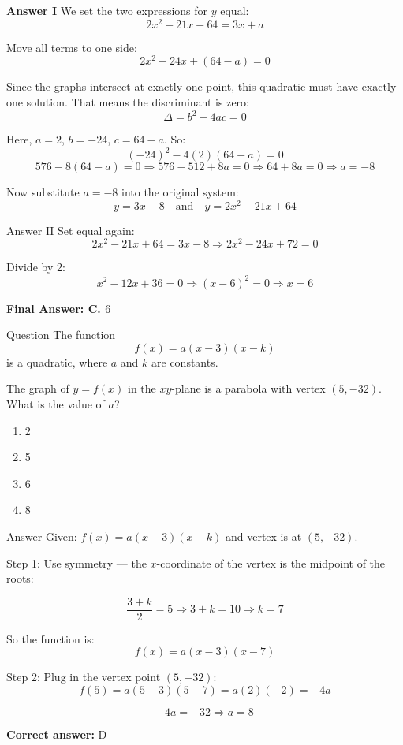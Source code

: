 \documentclass{beamer}
\begin{document}
\begin{frame}{\textbf{Answer I}}
\small
We set the two expressions for \(y\) equal:
\[
2x^2 - 21x + 64 = 3x + a
\]

Move all terms to one side:
\[
2x^2 - 24x + (64 - a) = 0
\]

Since the graphs intersect at exactly one point, this quadratic must have exactly one solution. That means the discriminant is zero:
\[
\Delta = b^2 - 4ac = 0
\]

Here, \(a = 2\), \(b = -24\), \(c = 64 - a\). So:
\[
(-24)^2 - 4(2)(64 - a) = 0
\]
\[
576 - 8(64 - a) = 0
\Rightarrow 576 - 512 + 8a = 0
\Rightarrow 64 + 8a = 0 \Rightarrow a = -8
\]

Now substitute \(a = -8\) into the original system:
\[
y = 3x - 8
\quad \text{and} \quad
y = 2x^2 - 21x + 64
\]


\end{frame}
\begin{frame}{Answer II}
    Set equal again:
\[
2x^2 - 21x + 64 = 3x - 8
\Rightarrow 2x^2 - 24x + 72 = 0
\]

Divide by 2:
\[
x^2 - 12x + 36 = 0
\Rightarrow (x - 6)^2 = 0 \Rightarrow \boxed{x = 6}
\]

\textbf{Final Answer: C. \(6\)}

\end{frame}


\begin{frame}{Question}
The function 
\[
f(x) = a(x - 3)(x - k)
\]
is a quadratic, where $a$ and $k$ are constants.

The graph of $y = f(x)$ in the $xy$-plane is a parabola with vertex $(5, -32)$. What is the value of $a$?

\begin{enumerate}
  \item[A)] 2
  \item[B)] 5
  \item[C)] 6
  \item[D)] 8
\end{enumerate}
\end{frame}

\begin{frame}{Answer}
Given: $f(x) = a(x - 3)(x - k)$ and vertex is at $(5, -32)$.

Step 1: Use symmetry — the $x$-coordinate of the vertex is the midpoint of the roots:

\[
\frac{3 + k}{2} = 5 \Rightarrow 3 + k = 10 \Rightarrow k = 7
\]

So the function is:
\[
f(x) = a(x - 3)(x - 7)
\]

Step 2: Plug in the vertex point $(5, -32)$:
\[
f(5) = a(5 - 3)(5 - 7) = a(2)(-2) = -4a
\]

\[
-4a = -32 \Rightarrow a = 8
\]

\textbf{Correct answer:} D
\end{frame}
\end{document}

